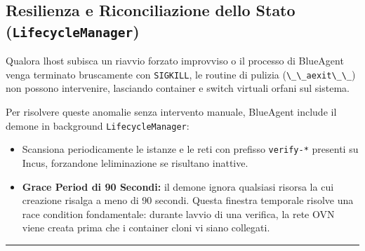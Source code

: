 \subsection{\texorpdfstring{Resilienza e Riconciliazione dello Stato
(\texttt{LifecycleManager})}{Resilienza e Riconciliazione dello Stato (LifecycleManager)}}\label{resilienza-e-riconciliazione-dello-stato-lifecyclemanager}

Qualora l\textquotesingle host subisca un riavvio forzato improvviso o
il processo di BlueAgent venga terminato bruscamente con
\passthrough{\lstinline!SIGKILL!}, le routine di pulizia
(\passthrough{\lstinline!\_\_aexit\_\_!}) non possono intervenire,
lasciando container e switch virtuali orfani sul sistema.

Per risolvere queste anomalie senza intervento manuale, BlueAgent
include il demone in background
\passthrough{\lstinline!LifecycleManager!}:

\begin{itemize}
\tightlist
\item
  Scansiona periodicamente le istanze e le reti con prefisso
  \passthrough{\lstinline!verify-*!} presenti su Incus, forzandone
  l\textquotesingle eliminazione se risultano inattive.
\item
  \textbf{Grace Period di 90 Secondi:} il demone ignora qualsiasi
  risorsa la cui creazione risalga a meno di 90 secondi. Questa finestra
  temporale risolve una race condition fondamentale: durante
  l\textquotesingle avvio di una verifica, la rete OVN viene creata
  prima che i container cloni vi siano collegati.
\end{itemize}

\begin{center}\rule{0.5\linewidth}{0.5pt}\end{center}
